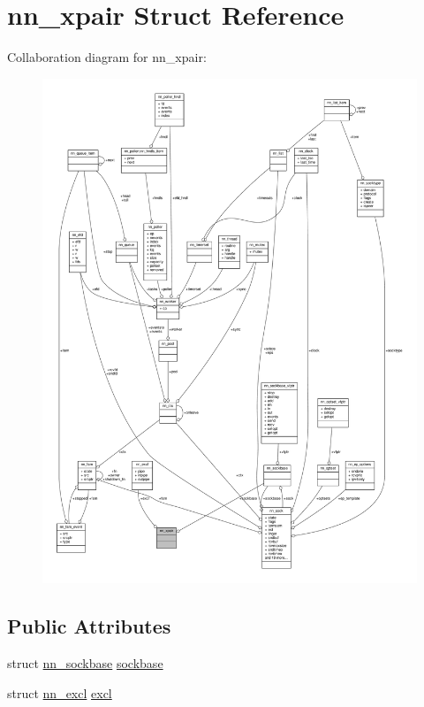 \hypertarget{structnn__xpair}{}\section{nn\+\_\+xpair Struct Reference}
\label{structnn__xpair}


Collaboration diagram for nn\+\_\+xpair\+:\nopagebreak
\begin{figure}[H]
\begin{center}
\leavevmode
\includegraphics[width=350pt]{structnn__xpair__coll__graph}
\end{center}
\end{figure}
\subsection*{Public Attributes}
\begin{DoxyCompactItemize}
\item 
struct \hyperlink{structnn__sockbase}{nn\+\_\+sockbase} \hyperlink{structnn__xpair_afe4579bfde9c85d49f8e0235063c50e8}{sockbase}
\item 
struct \hyperlink{structnn__excl}{nn\+\_\+excl} \hyperlink{structnn__xpair_afa806b85b6074e3a0a0208f4d8604488}{excl}
\end{DoxyCompactItemize}


